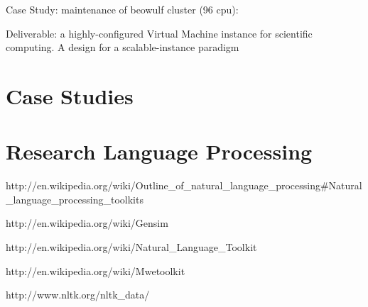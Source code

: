 Case Study: maintenance of beowulf cluster (96 cpu):


Deliverable: a highly-configured Virtual Machine instance for scientific computing.  
A design for a scalable-instance paradigm 

\section{Case Studies}

\section{Research Language Processing}

http://en.wikipedia.org/wiki/Outline_of_natural_language_processing#Natural_language_processing_toolkits

http://en.wikipedia.org/wiki/Gensim

http://en.wikipedia.org/wiki/Natural_Language_Toolkit

http://en.wikipedia.org/wiki/Mwetoolkit

http://www.nltk.org/nltk_data/







